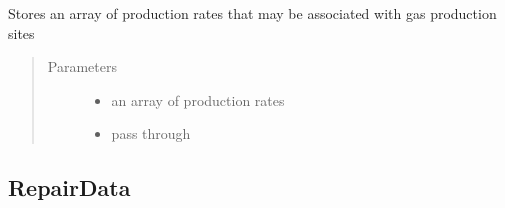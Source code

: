 \documentclass[letterpaper,10pt,english]{sphinxmanual}
\begin{document}
\begin{fulllineitems}
\label{\detokenize{index:feast.input_data_classes.ProductionData}}
Stores an array of production rates that may be associated with gas production sites
\begin{quote}\begin{description}
\item[{Parameters}] \leavevmode\begin{itemize}
\item {} 
 \textendash{} an array of production rates

\item {} 
 \textendash{} pass through

\end{itemize}

\end{description}\end{quote}

\end{fulllineitems}



\subsection{RepairData}
\label{\detokenize{index:repairdata}}
\end{document}
